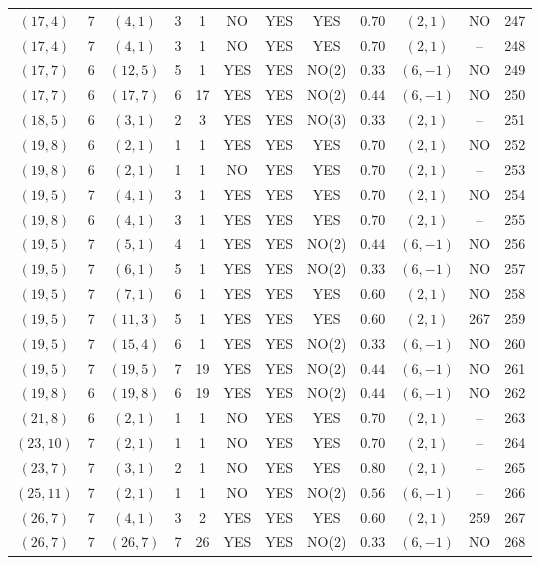 \begin{longtable}{|c|c|c|c|c|c|c|c|c|c|c|c|}
$(17,4)$ & 7 & $(4,1)$ & 3 & 1 & NO & YES & YES & $0.70$ & $(2,1)$ & NO & 247\\
$(17,4)$ & 7 & $(4,1)$ & 3 & 1 & NO & YES & YES & $0.70$ & $(2,1)$ & -- & 248\\
$(17,7)$ & 6 & $(12,5)$ & 5 & 1 & YES & YES & NO(2) & $0.33$ & $(6,-1)$ & NO & 249\\
$(17,7)$ & 6 & $(17,7)$ & 6 & 17 & YES & YES & NO(2) & $0.44$ & $(6,-1)$ & NO & 250\\
$(18,5)$ & 6 & $(3,1)$ & 2 & 3 & YES & YES & NO(3) & $0.33$ & $(2,1)$ & -- & 251\\
$(19,8)$ & 6 & $(2,1)$ & 1 & 1 & YES & YES & YES & $0.70$ & $(2,1)$ & NO & 252\\
$(19,8)$ & 6 & $(2,1)$ & 1 & 1 & NO & YES & YES & $0.70$ & $(2,1)$ & -- & 253\\
$(19,5)$ & 7 & $(4,1)$ & 3 & 1 & YES & YES & YES & $0.70$ & $(2,1)$ & NO & 254\\
$(19,8)$ & 6 & $(4,1)$ & 3 & 1 & YES & YES & YES & $0.70$ & $(2,1)$ & -- & 255\\
$(19,5)$ & 7 & $(5,1)$ & 4 & 1 & YES & YES & NO(2) & $0.44$ & $(6,-1)$ & NO & 256\\
$(19,5)$ & 7 & $(6,1)$ & 5 & 1 & YES & YES & NO(2) & $0.33$ & $(6,-1)$ & NO & 257\\
$(19,5)$ & 7 & $(7,1)$ & 6 & 1 & YES & YES & YES & $0.60$ & $(2,1)$ & NO & 258\\
$(19,5)$ & 7 & $(11,3)$ & 5 & 1 & YES & YES & YES & $0.60$ & $(2,1)$ & 267 & 259\\
$(19,5)$ & 7 & $(15,4)$ & 6 & 1 & YES & YES & NO(2) & $0.33$ & $(6,-1)$ & NO & 260\\
$(19,5)$ & 7 & $(19,5)$ & 7 & 19 & YES & YES & NO(2) & $0.44$ & $(6,-1)$ & NO & 261\\
$(19,8)$ & 6 & $(19,8)$ & 6 & 19 & YES & YES & NO(2) & $0.44$ & $(6,-1)$ & NO & 262\\
$(21,8)$ & 6 & $(2,1)$ & 1 & 1 & NO & YES & YES & $0.70$ & $(2,1)$ & -- & 263\\
$(23,10)$ & 7 & $(2,1)$ & 1 & 1 & NO & YES & YES & $0.70$ & $(2,1)$ & -- & 264\\
$(23,7)$ & 7 & $(3,1)$ & 2 & 1 & NO & YES & YES & $0.80$ & $(2,1)$ & -- & 265\\
$(25,11)$ & 7 & $(2,1)$ & 1 & 1 & NO & YES & NO(2) & $0.56$ & $(6,-1)$ & -- & 266\\
$(26,7)$ & 7 & $(4,1)$ & 3 & 2 & YES & YES & YES & $0.60$ & $(2,1)$ & 259 & 267\\
$(26,7)$ & 7 & $(26,7)$ & 7 & 26 & YES & YES & NO(2) & $0.33$ & $(6,-1)$ & NO & 268\\

\end{longtable}
